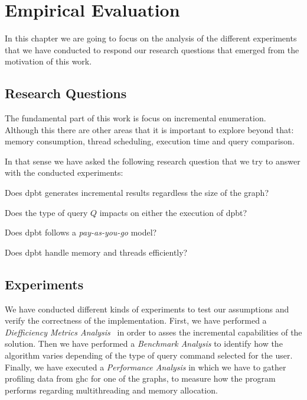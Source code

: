\chapter{Empirical Evaluation}\label{experiments}
In this chapter we are going to focus on the analysis of the different experiments that we have conducted
to respond our research questions that emerged from the motivation of this work. 

\section{Research Questions}
The fundamental part of this work is focus on incremental enumeration. Although this there are other areas that 
it is important to explore beyond that: memory consumption, thread scheduling, execution time and query comparison.

In that sense we have asked the following research question that we try to answer with the conducted experiments:
\begin{inparaenum}[\bf {\bf RQ}1\upshape)]
\label{res:bt:question}
    \item Does \acrshort{dpbt} generates incremental results regardless the size of the graph?
    \item Does the type of query $Q$ impacts on either the execution of \acrshort{dpbt}?
    \item Does \acrshort{dpbt} follows a \emph{pay-as-you-go} model?
    \item Does \acrshort{dpbt} handle memory and threads efficiently?
\end{inparaenum}
  
\section{Experiments}

We have conducted different kinds of experiments to test our assumptions and verify the correctness of the implementation.
First, we have performed a \emph{Diefficiency Metrics Analysis}~\cite{diefpaper} in order to asses the incremental capabilities of the solution. 
Then we have performed a \emph{Benchmark Analysis} to identify how the algorithm varies depending of the type of query command selected for the user.
Finally, we have executed a \textit{Performance Analysis} in which we have to gather profiling data from \acrfull{ghc} for one of the graphs, 
to measure how the program performs regarding multithreading and memory allocation.


